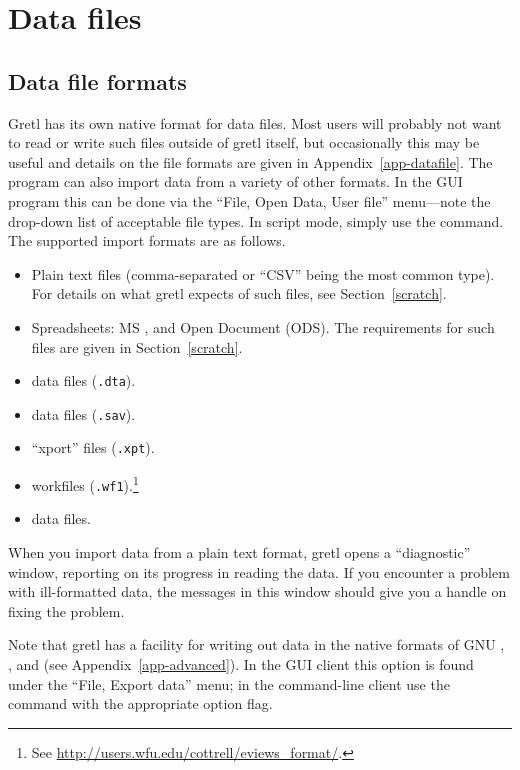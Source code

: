 \chapter{Data files}
\label{chap:datafiles}

\section{Data file formats}
\label{sec:data-formats}

Gretl has its own native format for data files.  Most users will
probably not want to read or write such files outside of gretl itself,
but occasionally this may be useful and details on the file formats
are given in Appendix~\ref{app-datafile}. The program can also import
data from a variety of other formats. In the GUI program this can be
done via the ``File, Open Data, User file'' menu---note the drop-down
list of acceptable file types. In script mode, simply use the
 command. The supported import formats are as follows.

\begin{itemize}
\item Plain text files (comma-separated or ``CSV'' being the most
  common type).  For details on what gretl expects of such files, see
  Section~\ref{scratch}.
\item Spreadsheets: MS ,  and Open Document
  (ODS). The requirements for such files are given in
  Section~\ref{scratch}.
\item {} data files (\texttt{.dta}).
\item {} data files (\texttt{.sav}).
\item {} ``xport'' files (\texttt{.xpt}).
\item {} workfiles (\texttt{.wf1}).\footnote{See
    \url{http://users.wfu.edu/cottrell/eviews_format/}.}
\item {} data files.
\end{itemize}

When you import data from a plain text format, gretl opens a
``diagnostic'' window, reporting on its progress in reading the data.
If you encounter a problem with ill-formatted data, the messages in
this window should give you a handle on fixing the problem.

Note that gretl has a facility for writing out data in the
native formats of GNU , ,  and
 (see Appendix~\ref{app-advanced}).  In the GUI client
this option is found under the ``File, Export data'' menu; in the
command-line client use the  command with the appropriate
option flag.

